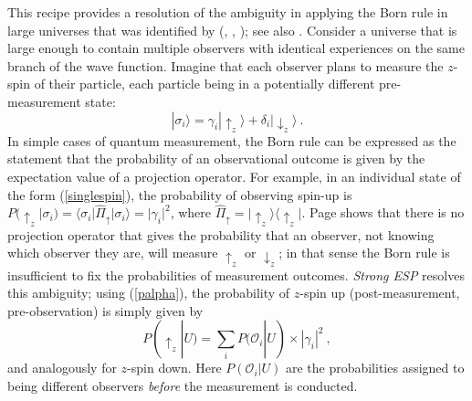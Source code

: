 \documentclass[12pt,onecolumn,secnumarabic,amsmath,amssymb,balancelastpage,nofootinbib]{article}
\newcommand{\calo}{{\mathcal O}}
\begin{document}
This recipe provides a resolution of the ambiguity in applying the Born rule in large universes that was identified by \citeauthor{Page:2009qe} (\citeyear{Page:2009qe}, \citeyear{Page:2009mb}, \citeyear{Page:2010bj}); see also \citep{Aguirre:2010rw,Albrecht:2012zp}. Consider a universe that is large enough to contain multiple observers  with identical experiences on the same branch of the wave function. Imagine that each observer plans to measure the $z$-spin of their particle, each particle being in a potentially different pre-measurement state:
\begin{equation}
  |\sigma_i\rangle = \gamma_i|\uparrow_z\rangle + \delta_i|\downarrow_z\rangle\ .
  \label{singlespin}
\end{equation}
In simple cases of quantum measurement, the Born rule can be expressed as the statement that the probability of an observational outcome is given by the expectation value of a projection operator. For example, in an individual state of the form (\ref{singlespin}), the probability of observing spin-up is $P({\uparrow_z}|\sigma_i) = \langle\sigma_i|\hat{\Pi}_\uparrow|\sigma_i\rangle = |\gamma_i|^2$, where $\hat{\Pi}_\uparrow = |{\uparrow_z}\rangle\langle {\uparrow_z}|$. Page shows that there is no projection operator that gives the probability that an observer, not knowing which observer they are, will measure $\uparrow_z$ or $\downarrow_z$; in that sense the Born rule is insufficient to fix the probabilities of measurement outcomes. \emph{Strong ESP} resolves this ambiguity; using (\ref{palpha}), the probability of $z$-spin up (post-measurement, pre-observation) is simply given by
\begin{equation}
  P({\uparrow_z}|U) = \sum_i P(\calo_i|U)\times|\gamma_i|^2\ ,
\end{equation}
and analogously for $z$-spin down.  Here $P(\calo_i|U)$ are the probabilities assigned to being different observers \emph{before} the measurement is conducted.
\end{document}
